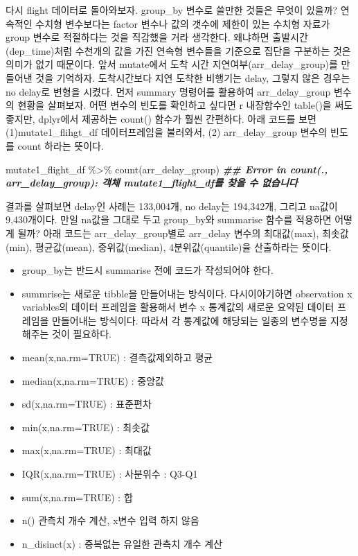 \documentclass[
]{book}
\newenvironment{Shaded}{\begin{snugshade}}{\end{snugshade}}
\newcommand{\DocumentationTok}[1]{\textcolor[rgb]{0.56,0.35,0.01}{\textbf{\textit{#1}}}}
\newcommand{\FunctionTok}[1]{\textcolor[rgb]{0.00,0.00,0.00}{#1}}
\newcommand{\NormalTok}[1]{#1}
\newcommand{\SpecialCharTok}[1]{\textcolor[rgb]{0.00,0.00,0.00}{#1}}
\providecommand{\tightlist}{%
  \setlength{\itemsep}{0pt}\setlength{\parskip}{0pt}}
\theoremstyle{definition}
\theoremstyle{definition}
\theoremstyle{definition}
\theoremstyle{definition}
\theoremstyle{remark}
\begin{document}
다시 flight 데이터로 돌아와보자. group\_by 변수로 쓸만한 것들은 무엇이 있을까? 연속적인 수치형 변수보다는 factor 변수나 값의 갯수에 제한이 있는 수치형 자료가 group 변수로 적절하다는 것을 직감했을 거라 생각한다. 왜냐하면 출발시간(dep\_time)처럼 수천개의 값을 가진 연속형 변수들을 기준으로 집단을 구분하는 것은 의미가 없기 때문이다.
앞서 mutate에서 도착 시간 지연여부(arr\_delay\_group)를 만들어낸 것을 기억하자.
도착시간보다 지연 도착한 비행기는 delay, 그렇지 않은 경우는 no delay로 변형을 시켰다. 먼저 summary 명령어를 활용하여 arr\_delay\_group 변수의 현황을 살펴보자. 어떤 변수의 빈도를 확인하고 싶다면 r 내장함수인 table()을 써도 좋지만, dplyr에서 제공하는 count() 함수가 훨씬 간편하다. 아래 코드를 보면 (1)mutate1\_flihgt\_df 데이터프레임을 불러와서, (2) arr\_delay\_group 변수의 빈도를 count 하라는 뜻이다.

\begin{Shaded}
\begin{Highlighting}[]
\NormalTok{mutate1\_flight\_df }\SpecialCharTok{\%\textgreater{}\%} 
  \FunctionTok{count}\NormalTok{(arr\_delay\_group)}
\DocumentationTok{\#\# Error in count(., arr\_delay\_group): 객체 \textquotesingle{}mutate1\_flight\_df\textquotesingle{}를 찾을 수 없습니다}
\end{Highlighting}
\end{Shaded}

결과를 살펴보면 delay인 사례는 133,004개, no delay는 194,342개, 그리고 na값이 9,430개이다. 만일 na값을 그대로 두고 group\_by와 summarise 함수를 적용하면 어떻게 될까? 아래 코드는 arr\_delay\_group별로 arr\_delay 변수의 최대값(max), 최솟값(min), 평균값(mean), 중위값(median), 4분위값(quantile)을 산출하라는 뜻이다.

\begin{itemize}
\tightlist
\item
  group\_by는 반드시 summarise 전에 코드가 작성되어야 한다.
\item
  summrise는 새로운 tibble을 만들어내는 방식이다. 다시이야기하면 observation x variables의 데이터 프레임을 활용해서 변수 x 통계값의 새로운 요약된 데이터 프레임을 만들어내는 방식이다. 따라서 각 통계값에 해당되는 일종의 변수명을 지정해주는 것이 필요하다.
\item
  mean(x,na.rm=TRUE) : 결측값제외하고 평균
\item
  median(x,na.rm=TRUE) : 중앙값
\item
  sd(x,na.rm=TRUE) : 표준편차
\item
  min(x,na.rm=TRUE) : 최솟값
\item
  max(x,na.rm=TRUE) : 최대값
\item
  IQR(x,na.rm=TRUE) : 사분위수 : Q3-Q1
\item
  sum(x,na.rm=TRUE) : 합
\item
  n() 관측치 개수 계산, x변수 입력 하지 않음
\item
  n\_disinct(x) : 중복없는 유일한 관측치 개수 계산
\end{itemize}
\end{document}
